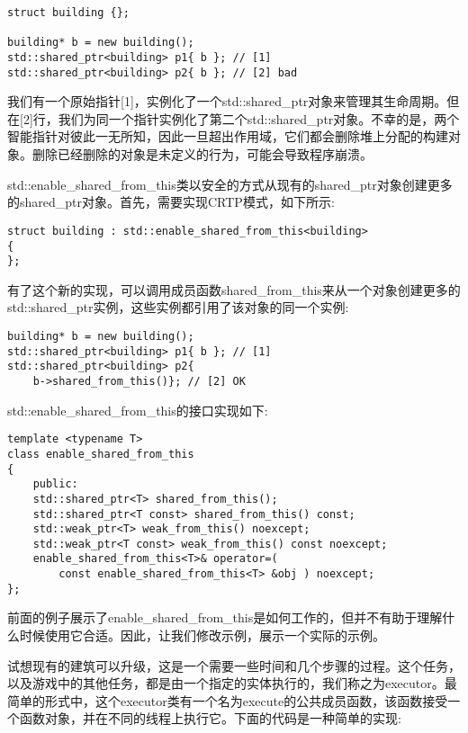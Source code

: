 \begin{lstlisting}[style=styleCXX]
struct building {};

building* b = new building();
std::shared_ptr<building> p1{ b }; // [1]
std::shared_ptr<building> p2{ b }; // [2] bad
\end{lstlisting}

我们有一个原始指针[1]，实例化了一个std::shared\_ptr对象来管理其生命周期。但在[2]行，我们为同一个指针实例化了第二个std::shared\_ptr对象。不幸的是，两个智能指针对彼此一无所知，因此一旦超出作用域，它们都会删除堆上分配的构建对象。删除已经删除的对象是未定义的行为，可能会导致程序崩溃。

std::enable\_shared\_from\_this类以安全的方式从现有的shared\_ptr对象创建更多的shared\_ptr对象。首先，需要实现CRTP模式，如下所示:

\begin{lstlisting}[style=styleCXX]
struct building : std::enable_shared_from_this<building>
{
};
\end{lstlisting}

有了这个新的实现，可以调用成员函数shared\_from\_this来从一个对象创建更多的std::shared\_ptr实例，这些实例都引用了该对象的同一个实例:

\begin{lstlisting}[style=styleCXX]
building* b = new building();
std::shared_ptr<building> p1{ b }; // [1]
std::shared_ptr<building> p2{
	b->shared_from_this()}; // [2] OK
\end{lstlisting}

std::enable\_shared\_from\_this的接口实现如下:

\begin{lstlisting}[style=styleCXX]
template <typename T>
class enable_shared_from_this
{
	public:
	std::shared_ptr<T> shared_from_this();
	std::shared_ptr<T const> shared_from_this() const;
	std::weak_ptr<T> weak_from_this() noexcept;
	std::weak_ptr<T const> weak_from_this() const noexcept;
	enable_shared_from_this<T>& operator=(
		const enable_shared_from_this<T> &obj ) noexcept;
};
\end{lstlisting}

前面的例子展示了enable\_shared\_from\_this是如何工作的，但并不有助于理解什么时候使用它合适。因此，让我们修改示例，展示一个实际的示例。

试想现有的建筑可以升级，这是一个需要一些时间和几个步骤的过程。这个任务，以及游戏中的其他任务，都是由一个指定的实体执行的，我们称之为executor。最简单的形式中，这个executor类有一个名为execute的公共成员函数，该函数接受一个函数对象，并在不同的线程上执行它。下面的代码是一种简单的实现:


